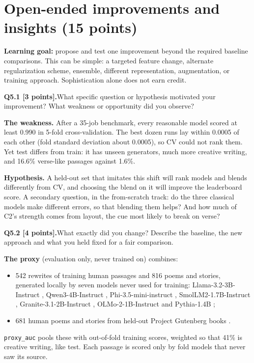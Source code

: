 \documentclass[11pt,letterpaper]{article}
\newcommand{\question}[2]{\needspace{4\baselineskip}\par\addvspace{0.45em}\noindent\textbf{#1}\quad #2\par\nobreak\vspace{0.1em}}
\begin{document}
\newpage
\section{Open-ended improvements and insights (15 points)}
\textbf{Learning goal:} propose and test one improvement beyond the required baseline comparisons. This can be simple: a targeted feature change, alternate regularization scheme, ensemble, different representation, augmentation, or training approach. Sophistication alone does not earn credit.

\question{Q5.1 [3 points].}{What specific question or hypothesis motivated your improvement? What weakness or opportunity did you observe?}
\textbf{The weakness.} After a 35-job benchmark, every reasonable model scored at least 0.990 in 5-fold cross-validation. The best dozen runs lay within 0.0005 of each other (fold standard deviation about 0.0005), so CV could not rank them. Yet test differs from train: it has unseen generators, much more creative writing, and 16.6\% verse-like passages against 1.6\%.

\textbf{Hypothesis.} A held-out set that imitates this shift will rank models and blends differently from CV, and choosing the blend on it will improve the leaderboard score. A secondary question, in the from-scratch track: do the three classical models make different errors, so that blending them helps? And how much of C2's strength comes from layout, the cue most likely to break on verse?

\question{Q5.2 [4 points].}{What exactly did you change? Describe the baseline, the new approach and what you held fixed for a fair comparison.}
\textbf{The proxy} (evaluation only, never trained on) combines:
\begin{itemize}
\item 542 rewrites of training human passages and 816 poems and stories, generated locally by seven models never used for training: Llama-3.2-3B-Instruct \cite{llama3}, Qwen3-4B-Instruct \cite{qwen3}, Phi-3.5-mini-instruct \cite{phi3}, SmolLM2-1.7B-Instruct \cite{smollm2}, Granite-3.1-2B-Instruct \cite{granite}, OLMo-2-1B-Instruct \cite{olmo2} and Pythia-1.4B \cite{pythia};
\item 681 human poems and stories from held-out Project Gutenberg books \cite{gutenberg}.
\end{itemize}
\texttt{proxy\_auc} pools these with out-of-fold training scores, weighted so that 41\% is creative writing, like test. Each passage is scored only by fold models that never saw its source.
\end{document}
